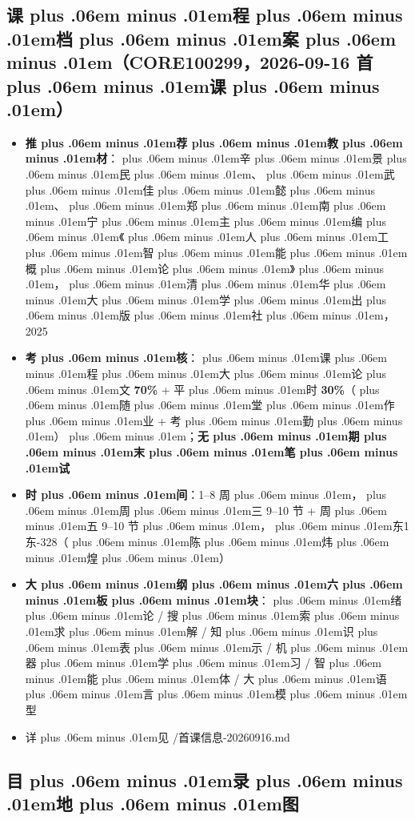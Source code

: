\documentclass[
]{article}
\newcommand{\passthrough}[1]{#1}
\providecommand{\tightlist}{%
  \setlength{\itemsep}{0pt}\setlength{\parskip}{0pt}}
\def\zh#1{{\zhfont #1}}
\def\codezh#1{{\zhmonofont #1}}
\def\zhglue{\hskip0pt plus .06em minus .01em}
\begin{document}
\subsection{\zh{课\zhglue 程\zhglue 档\zhglue 案\zhglue （}CORE100299\zh{，}2026-09-16 \zh{首\zhglue 课\zhglue ）}}\label{ux8bfeux7a0bux6863ux6848core1002992026-09-16-ux9996ux8bfe}

\begin{itemize}
\tightlist
\item
  \textbf{\zh{推\zhglue 荐\zhglue 教\zhglue 材}}\zh{：\zhglue 辛\zhglue 景\zhglue 民\zhglue 、\zhglue 武\zhglue 佳\zhglue 懿\zhglue 、\zhglue 郑\zhglue 南\zhglue 宁\zhglue 主\zhglue 编\zhglue 《\zhglue 人\zhglue 工\zhglue 智\zhglue 能\zhglue 概\zhglue 论\zhglue 》\zhglue ，\zhglue 清\zhglue 华\zhglue 大\zhglue 学\zhglue 出\zhglue 版\zhglue 社\zhglue ，}2025
\item
  \textbf{\zh{考\zhglue 核}}\zh{：\zhglue 课\zhglue 程\zhglue 大\zhglue 论\zhglue 文} \textbf{70\%} + \zh{平\zhglue 时} \textbf{30\%}\zh{（\zhglue 随\zhglue 堂\zhglue 作\zhglue 业} + \zh{考\zhglue 勤\zhglue ）\zhglue ；}\textbf{\zh{无\zhglue 期\zhglue 末\zhglue 笔\zhglue 试}}
\item
  \textbf{\zh{时\zhglue 间}}\zh{：}1--8 \zh{周\zhglue ，\zhglue 周\zhglue 三} 9--10 \zh{节} + \zh{周\zhglue 五} 9--10 \zh{节\zhglue ，\zhglue 东}1\zh{东}-328\zh{（\zhglue 陈\zhglue 炜\zhglue 煌\zhglue ）}
\item
  \textbf{\zh{大\zhglue 纲\zhglue 六\zhglue 板\zhglue 块}}\zh{：\zhglue 绪\zhglue 论} / \zh{搜\zhglue 索\zhglue 求\zhglue 解} / \zh{知\zhglue 识\zhglue 表\zhglue 示} / \zh{机\zhglue 器\zhglue 学\zhglue 习} / \zh{智\zhglue 能\zhglue 体} / \zh{大\zhglue 语\zhglue 言\zhglue 模\zhglue 型}
\item
  \zh{详\zhglue 见} \passthrough{\codezh{{\zh{资}}{\zh{料}}{\zh{原}}{\zh{件}}/{\zh{首}}{\zh{课}}{\zh{信}}{\zh{息}}-20260916.md}}
\end{itemize}

\subsection{\zh{目\zhglue 录\zhglue 地\zhglue 图}}\label{ux76eeux5f55ux5730ux56fe}
\end{document}

